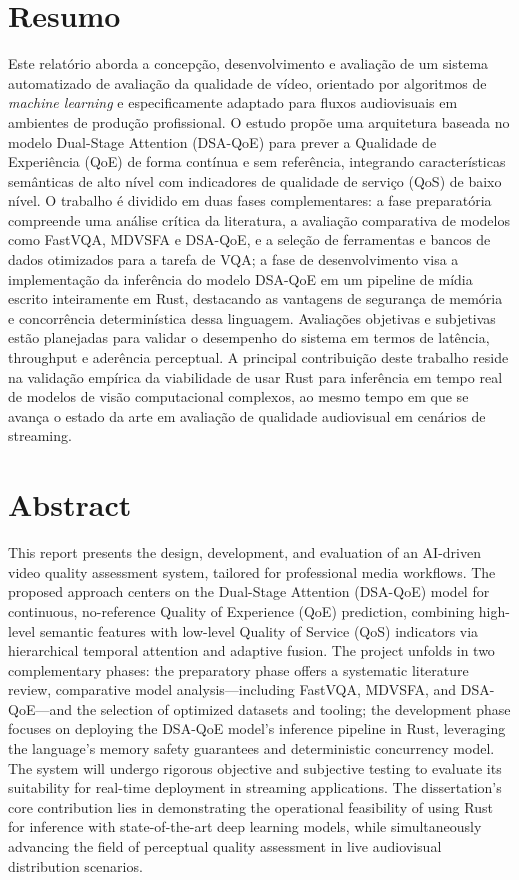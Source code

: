 \chapter*{Resumo}
Este relatório aborda a concepção, desenvolvimento e avaliação de um sistema automatizado de avaliação da qualidade de vídeo, orientado por algoritmos de \textit{machine learning} e especificamente adaptado para fluxos audiovisuais em ambientes de produção profissional. O estudo propõe uma arquitetura baseada no modelo Dual-Stage Attention (DSA-QoE) para prever a Qualidade de Experiência (QoE) de forma contínua e sem referência, integrando características semânticas de alto nível com indicadores de qualidade de serviço (QoS) de baixo nível. O trabalho é dividido em duas fases complementares: a fase preparatória compreende uma análise crítica da literatura, a avaliação comparativa de modelos como FastVQA, MDVSFA e DSA-QoE, e a seleção de ferramentas e bancos de dados otimizados para a tarefa de VQA; a fase de desenvolvimento visa a implementação da inferência do modelo DSA-QoE em um pipeline de mídia escrito inteiramente em Rust, destacando as vantagens de segurança de memória e concorrência determinística dessa linguagem. Avaliações objetivas e subjetivas estão planejadas para validar o desempenho do sistema em termos de latência, throughput e aderência perceptual. A principal contribuição deste trabalho reside na validação empírica da viabilidade de usar Rust para inferência em tempo real de modelos de visão computacional complexos, ao mesmo tempo em que se avança o estado da arte em avaliação de qualidade audiovisual em cenários de streaming.

\chapter*{Abstract}
This report presents the design, development, and evaluation of an AI-driven video quality assessment system, tailored for professional media workflows. The proposed approach centers on the Dual-Stage Attention (DSA-QoE) model for continuous, no-reference Quality of Experience (QoE) prediction, combining high-level semantic features with low-level Quality of Service (QoS) indicators via hierarchical temporal attention and adaptive fusion. The project unfolds in two complementary phases: the preparatory phase offers a systematic literature review, comparative model analysis—including FastVQA, MDVSFA, and DSA-QoE—and the selection of optimized datasets and tooling; the development phase focuses on deploying the DSA-QoE model’s inference pipeline in Rust, leveraging the language’s memory safety guarantees and deterministic concurrency model. The system will undergo rigorous objective and subjective testing to evaluate its suitability for real-time deployment in streaming applications. The dissertation's core contribution lies in demonstrating the operational feasibility of using Rust for inference with state-of-the-art deep learning models, while simultaneously advancing the field of perceptual quality assessment in live audiovisual distribution scenarios.
